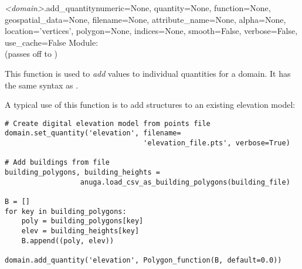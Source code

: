 \documentclass{manual}
\begin{document}
\begin{methoddesc}{\emph{<domain>}.add_quantity}{numeric=None,
                                                 quantity=None,
                                                 function=None,
                                                 geospatial_data=None,
                                                 filename=None,
                                                 attribute_name=None,
                                                 alpha=None,
                                                 location='vertices',
                                                 polygon=None,
                                                 indices=None,
                                                 smooth=False,
                                                 verbose=False,
                                                 use_cache=False}
Module:  \\
(passes off to )

\label{add quantity}
This function is used to \emph{add} values to individual quantities for a
domain. It has the same syntax as .

A typical use of this function is to add structures to an existing elevation model:

\begin{verbatim}
# Create digital elevation model from points file
domain.set_quantity('elevation', filename=
                                 'elevation_file.pts', verbose=True)

# Add buildings from file
building_polygons, building_heights =
                  anuga.load_csv_as_building_polygons(building_file)

B = []
for key in building_polygons:
    poly = building_polygons[key]
    elev = building_heights[key]
    B.append((poly, elev))

domain.add_quantity('elevation', Polygon_function(B, default=0.0))
\end{verbatim}
\end{methoddesc}
\end{document}
